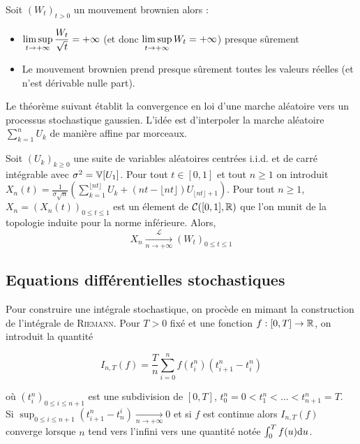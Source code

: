 \begin{prop}
  Soit $(W_t)_{t>0}$ un mouvement brownien alors :
  \begin{itemize}
    \item $\displaystyle\limsup_{t \to +\infty} \frac{W_t}{\sqrt{t}} = + \infty$ (et donc $\displaystyle\limsup_{t\to +\infty} W_t = +\infty$) presque sûrement
    \item Le mouvement brownien prend presque sûrement toutes les valeurs réelles (et n'est dérivable nulle part).
  \end{itemize}
\end{prop}

Le théorème suivant établit la convergence en loi d'une marche aléatoire vers un processus stochastique gaussien. L'idée est d'interpoler la marche aléatoire $ \sum_{k=1}^{n} U_k$ de manière affine par morceaux. 
\begin{thm}[Donsker]
  Soit $(U_k)_{k\geq 0}$ une suite de variables aléatoires centrées i.i.d. et de carré intégrable avec $\sigma^2 = \mathbb{V}[U_1]$. Pour tout $t \in [0,1]$ et tout $n \geq 1$ on introduit $X_n(t) = \frac{1}{\sigma\sqrt{n}}\left(\sum_{k=1}^{\lfloor nt \rfloor} U_k + (nt - \lfloor nt \rfloor)U_{\lfloor nt \rfloor +1 }\right)$. Pour tout $n\geq 1$, $X_n = (X_n(t))_{0\leq t \leq 1}$ est un élement de $\mathcal{C}([0,1], \mathbb{R})$ que l'on munit de la topologie induite pour la norme inférieure.
Alors,
  \[ X_n \xrightarrow[n\to +\infty]{\mathcal{L}} (W_t)_{0 \leq t \leq 1} \]
\end{thm}

\subsection{Equations différentielles stochastiques}

Pour construire une intégrale stochastique, on procède en mimant la construction de l'intégrale de \textsc{Riemann}. Pour $T>0$ fixé et une fonction $f : [0,T] \rightarrow \mathbb{R}$, on introduit la quantité 

\[ I_{n,T}(f) = \frac{T}{n} \sum_{i=0}^n f(t_i^n)\left(t_{i+1}^n - t_i^n\right) \]

où $(t_i^n)_{0 \leq i \leq n+1}$ est une subdivision de $[0,T]$, $t_0^n = 0 < t_1^n < \ldots < t_{n+1}^n = T$. \\

Si $\sup_{0\leq i \leq n+1}(t_{i+1}^n - t_n^i)\xrightarrow[n\to +\infty]{} 0$ et si $f$ est continue alors $I_{n,T}(f)$ converge lorsque $n$ tend vers l'infini vers une quantité notée $ \int_{0}^{T} f(u) \mathrm{d} u$. \\

